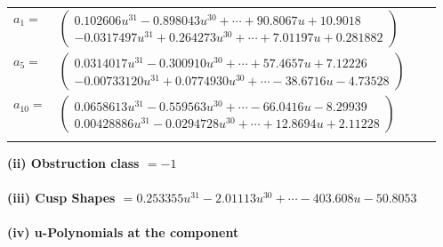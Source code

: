 \documentclass[1p]{elsarticle_modified}
\theoremstyle{definition}
\begin{document}
\begin{tabular}{m{7pt} m{180pt} m{7pt} m{180pt} }
\flushright $a_{1}=$&$\begin{pmatrix}0.102606 u^{31}-0.898043 u^{30}+\cdots+90.8067 u+10.9018\\-0.0317497 u^{31}+0.264273 u^{30}+\cdots+7.01197 u+0.281882\end{pmatrix}$ \\
\flushright $a_{5}=$&$\begin{pmatrix}0.0314017 u^{31}-0.300910 u^{30}+\cdots+57.4657 u+7.12226\\-0.00733120 u^{31}+0.0774930 u^{30}+\cdots-38.6716 u-4.73528\end{pmatrix}$ \\
\flushright $a_{10}=$&$\begin{pmatrix}0.0658613 u^{31}-0.559563 u^{30}+\cdots-66.0416 u-8.29939\\0.00428886 u^{31}-0.0294728 u^{30}+\cdots+12.8694 u+2.11228\end{pmatrix}$\\&\end{tabular}
\flushleft \textbf{(ii) Obstruction class $= -1$}\\~\\
\flushleft \textbf{(iii) Cusp Shapes $= 0.253355 u^{31}-2.01113 u^{30}+\cdots-403.608 u-50.8053$}\\~\\
\newpage\renewcommand{\arraystretch}{1}
\flushleft \textbf{(iv) u-Polynomials at the component}\newline \\
\end{document}
